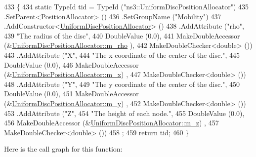 \begin{DoxyCode}
433 \{
434   \textcolor{keyword}{static} TypeId tid = TypeId (\textcolor{stringliteral}{"ns3::UniformDiscPositionAllocator"})
435     .SetParent<\hyperlink{classns3_1_1PositionAllocator_a944cf6b97b874e06983c1f3e81cf3ea6}{PositionAllocator}> ()
436     .SetGroupName (\textcolor{stringliteral}{"Mobility"})
437     .AddConstructor<\hyperlink{classns3_1_1UniformDiscPositionAllocator_ad544cce2573d5109d540768323ac809a}{UniformDiscPositionAllocator}> ()
438     .AddAttribute (\textcolor{stringliteral}{"rho"},
439                    \textcolor{stringliteral}{"The radius of the disc"},
440                    DoubleValue (0.0),
441                    MakeDoubleAccessor (&\hyperlink{classns3_1_1UniformDiscPositionAllocator_a6fad72ec695817051001a3099ef3a2e4}{UniformDiscPositionAllocator::m\_rho}
      ),
442                    MakeDoubleChecker<double> ())
443     .AddAttribute (\textcolor{stringliteral}{"X"},
444                    \textcolor{stringliteral}{"The x coordinate of the center of the  disc."},
445                    DoubleValue (0.0),
446                    MakeDoubleAccessor (&\hyperlink{classns3_1_1UniformDiscPositionAllocator_a75d18640eddf7d54a13e8aba70af7c05}{UniformDiscPositionAllocator::m\_x})
      ,
447                    MakeDoubleChecker<double> ())
448     .AddAttribute (\textcolor{stringliteral}{"Y"},
449                    \textcolor{stringliteral}{"The y coordinate of the center of the  disc."},
450                    DoubleValue (0.0),
451                    MakeDoubleAccessor (&\hyperlink{classns3_1_1UniformDiscPositionAllocator_aa40b9a3c579a9993ca67f20a82a8d1f5}{UniformDiscPositionAllocator::m\_y})
      ,
452                    MakeDoubleChecker<double> ())
453     .AddAttribute (\textcolor{stringliteral}{"Z"},
454                    \textcolor{stringliteral}{"The height of each node."},
455                    DoubleValue (0.0),
456                    MakeDoubleAccessor (&\hyperlink{classns3_1_1UniformDiscPositionAllocator_aeaac1a59c1eb5af1433099616a97fc64}{UniformDiscPositionAllocator::m\_z})
      ,
457                    MakeDoubleChecker<double> ())
458   ;
459   \textcolor{keywordflow}{return} tid;
460 \}
\end{DoxyCode}


Here is the call graph for this function\+:



